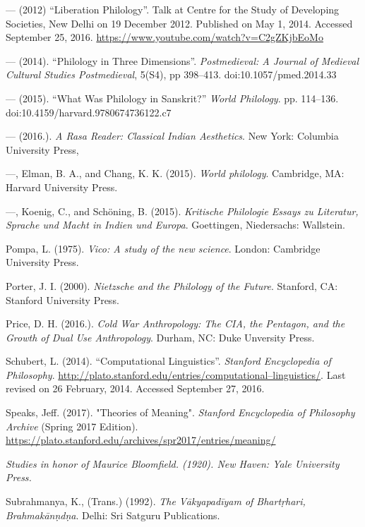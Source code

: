 \begin{thebibliography}{99}
  — (2012) “Liberation Philology”. Talk at Centre for the Study of Developing Societies, New Delhi on 19 December 2012. Published on May 1, 2014. Accessed September 25, 2016. \url{https://www.youtube.com/watch?v=C2gZKjbEoMo}

  — (2014). “Philology in Three Dimensions”. \textit{Postmedieval: A Journal of Medieval Cultural Studies Postmedieval}, 5(S4), pp 398–413. doi:10.1057/pmed.2014.33

  — (2015). “What Was Philology in Sanskrit?” \textit{World Philology}. pp. 114–136. doi:10.4159/harvard.9780674736122.c7

  — (2016.). \textit{A Rasa Reader: Classical Indian Aesthetics}. New York: Columbia University Press,

  —, Elman, B. A., and Chang, K. K. (2015). \textit{World philology}. Cambridge, MA: Harvard University Press.

  —, Koenig, C., and Schöning, B. (2015). \textit{Kritische Philologie Essays zu Literatur, Sprache und Macht in Indien und Europa}. Goettingen, Niedersachs: Wallstein.

  Pompa, L. (1975). \textit{Vico: A study of the new science}. London: Cambridge University Press.

  Porter, J. I. (2000). \textit{Nietzsche and the Philology of the Future}. Stanford, CA: Stanford University Press.

  Price, D. H. (2016.). \textit{Cold War Anthropology: The CIA, the Pentagon, and the Growth of Dual Use Anthropology}. Durham, NC: Duke Unversity Press.

  Schubert, L. (2014). “Computational Linguistics”. \textit{Stanford Encyclopedia of Philosophy}. \url{http://plato.stanford.edu/entries/computational–linguistics/}. Last revised on 26 February, 2014. Accessed September 27, 2016.

  Speaks, Jeff. (2017). "Theories of Meaning". \textit{Stanford Encyclopedia of Philosophy Archive} (Spring 2017 Edition). \url{https://plato.stanford.edu/archives/spr2017/entries/meaning/}

  \textit{Studies in honor of Maurice Bloomfield. (1920). New Haven: Yale University Press.}

  Subrahmanya, K., (Trans.) (1992). \textit{The Vākyapadīyam of Bhartṛhari, Brahmakānṇdṇa}. Delhi: Sri Satguru Publications.


\end{thebibliography}
